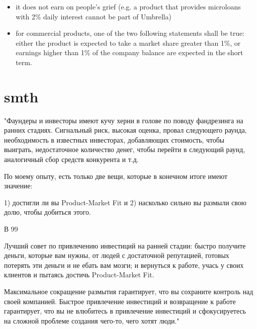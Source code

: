 \documentclass[11pt]{article}
\theoremstyle{remark}
\theoremstyle{definition}
\begin{document}
\begin{itemize}
\item it does not earn on people's grief (e.g. a product that provides microloans with 2\% daily interest cannot be part of Umbrella)
\item for commercial products, one of the two following statements shall be true: either the product is expected to take a market share greater than 1\%, or earnings higher than 1\% of the company balance are expected in the short term. 
\end{itemize}

\section{smth}

"Фаундеры и инвесторы имеют кучу херни в голове по поводу фандрезинга на ранних стадиях. Сигнальный риск, высокая оценка, провал следующего раунда, необходимость в известных инвесторах, добавляющих стоимость, чтобы выиграть, недостаточное количество денег, чтобы перейти в следующий раунд, аналогичный сбор средств конкурента и т.д.

По моему опыту, есть только две вещи, которые в конечном итоге имеют значение: 

1) достигли ли вы Product-Market Fit 
и 
2) насколько сильно вы размыли свою долю, чтобы добиться этого.

В 99%

Лучший совет по привлечению инвестиций на ранней стадии: быстро получите деньги, которые вам нужны, от людей с достаточной репутацией, готовых потерять эти деньги и не ебать вам мозги; и вернуться к работе, учась у своих клиентов и пытаясь достичь Product-Market Fit.

Максимальное сокращение размытия гарантирует, что вы сохраните контроль над своей компанией. Быстрое привлечение инвестиций и возвращение к работе гарантирует, что вы не влюбитесь в привлечение инвестиций и сфокусируетесь на сложной проблеме создания чего-то, чего хотят люди."
\end{document}
